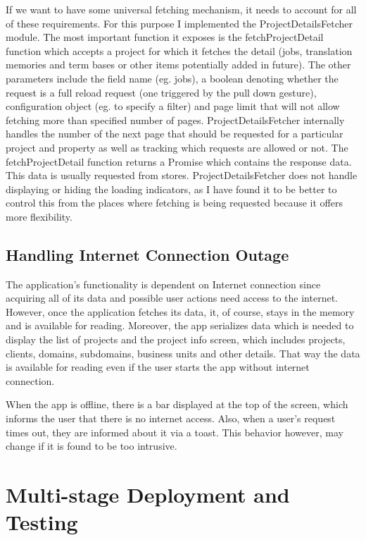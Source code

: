 If we want to have some universal fetching mechanism, it needs to account for all of these requirements. For this purpose I implemented the ProjectDetailsFetcher module. The most important function it exposes is the fetchProjectDetail function which accepts a project for which it fetches the detail (jobs, translation memories and term bases or other items  potentially added in future). The other parameters include the field name (eg. jobs), a boolean denoting whether the request is a full reload request (one triggered by the pull down gesture), configuration object (eg. to specify a filter) and page limit that will not allow fetching more than specified number of pages.
ProjectDetailsFetcher internally handles the number of the next page that should be requested for a particular project and property as well as tracking which requests are allowed or not. The fetchProjectDetail function returns a Promise which contains the response data. This data is usually requested from stores. ProjectDetailsFetcher does not handle displaying or hiding the loading indicators, as I have found it to be better to control this from the places where fetching is being requested because it offers more flexibility.




\subsection{Handling Internet Connection Outage}

The application’s functionality is dependent on Internet connection since acquiring all of its data and possible user actions need access to the internet. However, once the application fetches its data, it, of course, stays in the memory and is available for reading. Moreover, the app serializes data which is needed to display the list of projects and the project info screen, which includes projects, clients, domains, subdomains, business units and other details. That way the data is available for reading even if the user starts the app without internet connection.

When the app is offline, there is a bar displayed at the top of the screen, which informs the user that there is no internet access. Also, when a user's request times out, they are informed about it via a toast. This behavior however, may change if it is found to be too intrusive.


\section{Multi-stage Deployment and Testing}


